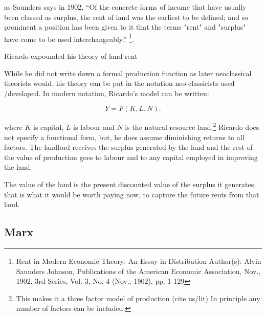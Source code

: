 as Saunders says in 1902, ``Of the concrete forms of income that have usually been classed as surplus, the rent of land was the earliest to be defined; and so prominent a position has been given to it that the terms "rent" and "surplus" have come to be used interchangeably.'' \footnote{Rent in Modern Economic Theory: An Essay in Distribution Author(s): Alvin Saunders Johnson, Publications of the American Economic Association, Nov., 1902, 3rd Series, Vol. 3, No. 4 (Nov., 1902), pp. 1-129}. 

Ricardo expounded his theory of land rent %

While he did not write down a formal production function as later neoclassical theorists would, his theory can be put in the notation neo-classicists used /developed. In modern notation, Ricardo's model can be written: 

\begin{equation} 
Y=F(K,L,N).
\label{eqn-production-ricardo}
\end{equation} 

where $K$ is capital, $L$ is labour and $N$  is the natural resource land.\footnote{This makes it a three factor model of production (cite us/lit) In principle any number of factors can be included.}  
Ricardo does not specify a functional form, but, %
he does assume diminishing returns to all factors. The landlord  receives the surplus generated by the land and the rest of the value of production goes to labour and to any capital employed in improving the land. 

The value of the land is the present discounted value of the surplus it generates, that is what it would be worth paying now, to capture the future rents from that land.


\subsection{Marx}


